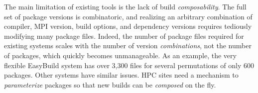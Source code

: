 The main limitation of existing tools is the lack of build {\it composability}.
The full set of package versions is combinatoric, and realizing an arbitrary
combination of compiler, MPI version, build options, and dependency versions
requires tediously modifying many package files.
%
Indeed, the number of package files required for existing systems scales with
the number of version {\it combinations}, not the number of packages, which
quickly becomes unmanageable.  As an example, the very flexible EasyBuild
system has over 3,300 files for several permutations of only 600 packages. 
Other systems have similar issues. HPC sites need a mechanism to 
{\it parameterize} packages so that new builds can be {\it composed} on the fly.











